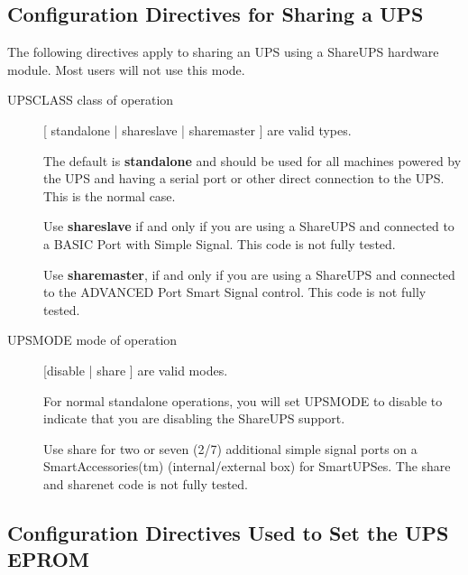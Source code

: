 {{{{{{{\label{Configuration-Directives-for-Sharing-a-UPS}

\subsection*{Configuration Directives for Sharing a UPS}

\label{index-Directives-Sharing-247}
The following directives apply to sharing an UPS using a ShareUPS hardware
module. Most users will not use this mode.

\begin{description}

\item [UPSCLASS \lt{}class of operation\gt{}]
   [ standalone | shareslave | sharemaster ] are valid types.

The default is {\bf standalone} and should be used for all machines powered by
the UPS and having a serial port or other direct connection to the UPS. 
This is the normal case.

Use {\bf shareslave} if and only if you are using a ShareUPS and connected to
a BASIC Port with Simple Signal. This code is not fully tested.  

Use {\bf sharemaster}, if and only if you are using a ShareUPS and connected
to the ADVANCED Port Smart Signal control. This code is not fully tested.  

\item [UPSMODE \lt{}mode of operation\gt{}]
   [disable | share ] are valid modes.

For normal standalone operations, you will set UPSMODE to disable to indicate
that you are disabling the ShareUPS support.  

Use share for two or seven (2/7) additional simple signal ports on a
SmartAccessories(tm) (internal/external box) for SmartUPSes. The share and
sharenet code is not fully tested.  

\end{description}

\label{Configuration-Directives-Used-to-Set-the-UPS-EPROM}

\subsection*{Configuration Directives Used to Set the UPS EPROM}

}}}}}}}

